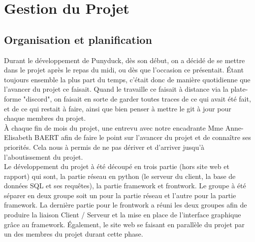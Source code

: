 \documentclass{report}
\begin{document}
\chapter{Gestion du Projet}
\section{Organisation et planification}
Durant le développement de Punyduck, dès son début, on a décidé de se mettre dans le projet après le repas du midi,
ou dès que l'occasion ce présentait. Étant toujours ensemble la plus part du temps, c'était donc de manière quotidienne que l'avancer du projet ce faisait. Quand le travaille ce faisait à distance via la plate-forme "discord", on faisait en sorte de garder toutes traces de ce qui avait été fait, et de ce qui restait à faire, ainsi que bien penser à mettre le git à jour pour chaque membres du projet.\\

À chaque fin de mois du projet, une entrevu avec notre encadrante Mme Anne-Elisabeth BAERT afin de faire le point sur l'avancer du projet et de connaître ses priorités. Cela nous à permis de ne pas dériver et d'arriver jusqu'à l'aboutissement du projet. \\

Le développement du projet à été découpé en trois partie (hors site web et rapport) qui sont, la partie réseau en python (le serveur du client, la base de données SQL et ses requêtes), la partie framework et frontwork. Le groupe à été séparer en deux groupe soit un pour la partie réseau et l'autre pour la partie framework. La dernière partie pour le frontwork a réuni les deux groupes afin de produire la liaison Client / Serveur et la mise en place de l'interface graphique grâce au framework.
Également, le site web se faisant en parallèle du projet par un des membres du projet durant cette phase.\\
\end{document}
